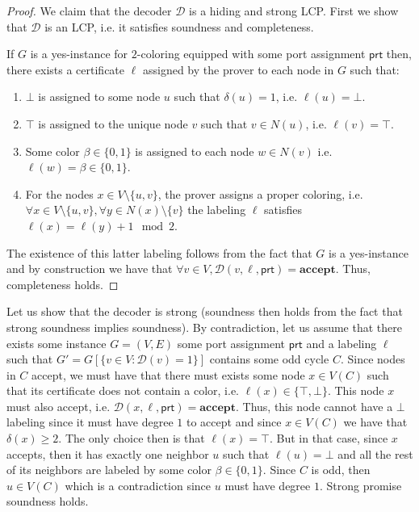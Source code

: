\documentclass[11pt]{article}
\newcommand*{\ports}{\mathsf{prt}}
\begin{document}
\begin{proof}
We claim that the decoder $\mathcal{D}$ is a hiding and strong LCP. First we show that $\mathcal{D}$ is an LCP, i.e. it satisfies soundness and completeness.

If $G$ is a yes-instance for $2$-coloring equipped with some port assignment $\ports$  then, there exists a certificate $\ell$ assigned by the prover to each node in $G$ such that:

\begin{enumerate}
    \item $\bot$ is assigned to some node $u$ such that $\delta(u) =1$, i.e. $\ell(u) = \bot$.
    \item $\top$ is assigned to the unique node $v$ such that $v \in N(u)$, i.e. $\ell(v)= \top$.
    \item Some color $\beta \in \{0,1\}$ is assigned to each node $w \in N(v)$ i.e. $\ell(w) = \beta \in \{0,1\}$. 
    \item For the nodes $x \in V\setminus\{u,v\}$, the prover assigns a proper coloring, i.e. $\forall x \in V\setminus\{u,v\} , \forall y \in N(x)\setminus \{v\}$ the labeling $\ell$ satisfies  $\ell(x) = \ell(y)+1\mod 2$.
\end{enumerate}
The existence of this latter labeling follows from the fact that $G$ is a yes-instance and by construction we have that $\forall v \in V, \mathcal{D}(v,\ell,\ports) = \textbf{accept}$. Thus, completeness holds.
\end{proof}
Let us show that the decoder is strong (soundness then holds from the fact that strong soundness implies soundness). By contradiction, let us assume that there exists some instance $G=(V,E)$ some port assignment $\ports$ and a labeling $\ell$ such that $G' = G [\{v\in V: \mathcal{D}(v)=1\}]$ contains some odd cycle $C$. Since nodes in $C$ accept, we must have that there must exists some node $x \in V(C)$ such that its certificate does not contain a color, i.e. $\ell(x) \in \{\top,\bot\}$. This node $x$ must also accept, i.e. $\mathcal{D}(x,\ell,\ports) = \textbf{accept.}$ Thus, this node cannot have a $\bot$ labeling since it must have degree $1$ to accept and since $x\in V(C)$ we have that $\delta(x)\geq 2$. The only choice then is that $\ell(x) = \top$. But in that case, since $x$ accepts, then it has exactly one neighbor $u$ such that $\ell(u)=\bot$ and all the rest of its neighbors are labeled by some color $\beta \in \{0,1\}$. Since $C$ is odd, then $u \in V(C)$ which is a contradiction since $u$ must have degree $1$. Strong promise soundness holds.
\end{document}
